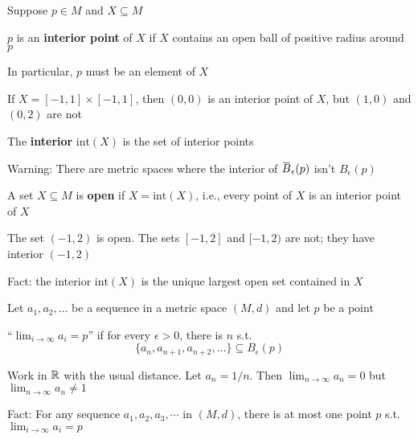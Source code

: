 \documentclass[11pt]{article}
\def \tint {\text{int}}
\begin{document}
Suppose \(p\in M\) and \(X\subseteq M\)
\begin{definition}[]
\(p\) is an \textbf{interior point} of \(X\) if \(X\) contains an open ball of positive radius around \(p\)
\end{definition}

In particular, \(p\) must be an element of \(X\)


\begin{examplle}[]
If \(X=[-1,1]\times[-1,1]\), then \((0,0)\) is an interior point of \(X\), but \((1,0)\)
and \((0,2)\) are not
\end{examplle}

\begin{definition}[]
The \textbf{interior} \(\tint(X)\) is the set of interior points
\end{definition}

Warning: There are metric spaces where the interior of \(\barB_\epsilon(p)\) isn't \(B_\epsilon(p)\)

\begin{definition}[]
A set \(X\subseteq M\) is \textbf{open} if \(X=\tint(X)\), i.e., every point of \(X\) is an interior point of \(X\)
\end{definition}

\begin{examplle}[in \(\R\)]
The set \((-1,2)\) is open. The sets \([-1,2]\) and \([-1,2)\) are not; they have interior \((-1,2)\)
\end{examplle}

Fact: the interior \(\tint(X)\) is the unique largest open set contained in \(X\)

Let \(a_1,a_2,\dots\) be a sequence in a metric space \((M,d)\) and let \(p\) be a point
\begin{definition}[]
``\(\lim_{i\to\infty}a_i=p\)'' if for every \(\epsilon>0\), there is \(n\) s.t.
\begin{equation*}
\{a_n,a_{n+1},a_{n+2},\dots\}\subseteq B_\epsilon(p)
\end{equation*}
\end{definition}

\begin{examplle}[]
Work in \(\R\) with the usual distance. Let \(a_n=1/n\). Then \(\lim_{n\to\infty}a_n=0\)
but \(\lim_{n\to\infty}a_n\neq 1\)
\end{examplle}

Fact: For any sequence \(a_1,a_2,a_3,\cdots\) in \((M,d)\), there is at most one point \(p\)
s.t. \(\lim_{i\to\infty}a_i=p\)
\end{document}
